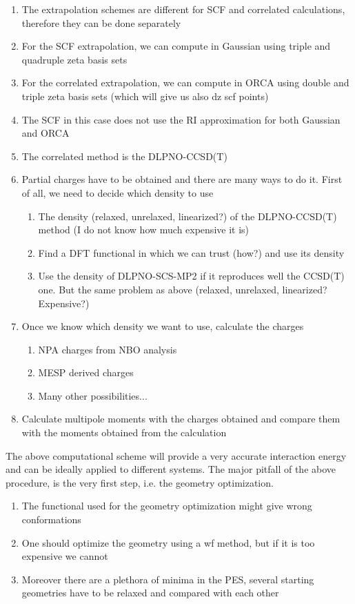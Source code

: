 \documentclass[utf8]{article}
\begin{document}
\begin{enumerate}
    \item The extrapolation schemes are different for SCF and correlated calculations, therefore they can be done separately
    \item For the SCF extrapolation, we can compute in Gaussian using triple and quadruple zeta basis sets
    \item For the correlated extrapolation, we can compute in ORCA using double and triple zeta basis sets (which will give us also dz scf points)
    \item The SCF in this case does not use the RI approximation for both Gaussian and ORCA
    \item The correlated method is the DLPNO-CCSD(T)
    \item Partial charges have to be obtained and there are many ways to do it. First of all, we need to decide which density to use
    \begin{enumerate}
        \item The density (relaxed, unrelaxed, linearized?) of the DLPNO-CCSD(T) method (I do not know how much expensive it is)
        \item Find a DFT functional in which we can trust (how?) and use its density
        \item Use the density of DLPNO-SCS-MP2 if it reproduces well the CCSD(T) one. But the same problem as above (relaxed, unrelaxed, linearized? Expensive?)
    \end{enumerate}
    \item Once we know which density we want to use, calculate the charges
    \begin{enumerate}
        \item NPA charges from NBO analysis
        \item MESP derived charges
        \item Many other possibilities...
    \end{enumerate}
    \item Calculate multipole moments with the charges obtained and compare them with the moments obtained from the calculation
\end{enumerate}
%
The above computational scheme will provide a very accurate interaction energy and can be ideally applied to different systems. The major pitfall of the above procedure, is the very first step, i.e. the geometry optimization.
%
\begin{enumerate}
    \item The functional used for the geometry optimization might give wrong conformations
    \item One should optimize the geometry using a wf method, but if it is too expensive we cannot
    \item Moreover there are a plethora of minima in the PES, several starting geometries have to be relaxed and compared with each other
\end{enumerate}
\end{document}
